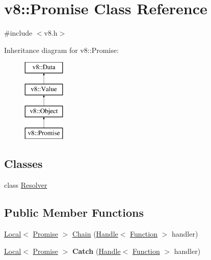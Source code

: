 \hypertarget{classv8_1_1_promise}{}\section{v8\+:\+:Promise Class Reference}
\label{classv8_1_1_promise}


{\ttfamily \#include $<$v8.\+h$>$}

Inheritance diagram for v8\+:\+:Promise\+:\begin{figure}[H]
\begin{center}
\leavevmode
\includegraphics[height=4.000000cm]{classv8_1_1_promise}
\end{center}
\end{figure}
\subsection*{Classes}
\begin{DoxyCompactItemize}
\item 
class \hyperlink{classv8_1_1_promise_1_1_resolver}{Resolver}
\end{DoxyCompactItemize}
\subsection*{Public Member Functions}
\begin{DoxyCompactItemize}
\item 
\hyperlink{classv8_1_1_local}{Local}$<$ \hyperlink{classv8_1_1_promise}{Promise} $>$ \hyperlink{classv8_1_1_promise_af56616dc11de23d6d515b0fa5d42e1eb}{Chain} (\hyperlink{classv8_1_1_handle}{Handle}$<$ \hyperlink{classv8_1_1_function}{Function} $>$ handler)
\item 
\hypertarget{classv8_1_1_promise_aab3dea5d0875e1506b9c8fc822b0e005}{}\hyperlink{classv8_1_1_local}{Local}$<$ \hyperlink{classv8_1_1_promise}{Promise} $>$ {\bfseries Catch} (\hyperlink{classv8_1_1_handle}{Handle}$<$ \hyperlink{classv8_1_1_function}{Function} $>$ handler)\label{classv8_1_1_promise_aab3dea5d0875e1506b9c8fc822b0e005}

\end{DoxyCompactItemize}
